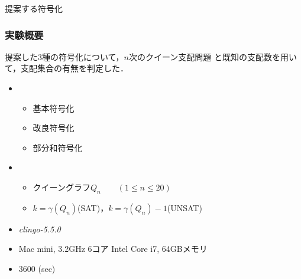 \documentclass[dvipdfmx,10pt]{beamer}
\begin{document}
\begin{frame}{提案する符号化}
\end{frame}

%
%
 
\begin{frame}\frametitle{実験概要}
 \begin{block}{}
  提案した3種の符号化について，$n$次のクイーン支配問題
  と既知の支配数を用いて，支配集合の有無を判定した．
 \end{block}
 \begin{itemize}
  \item {}
	\begin{itemize}
	 \item 基本符号化
	 \item 改良符号化
	 \item 部分和符号化
	\end{itemize}
  \item {}
	\begin{itemize}
	 \item クイーングラフ$Q_{n} \qquad (1 \leq n \leq 20)$
	 \item $k=\gamma(Q_{n})$\quad (SAT)，$k=\gamma(Q_{n})-1$\quad (UNSAT)
	\end{itemize}
  \item {} \textit{clingo-5.5.0}
  \item {} Mac mini, 3.2GHz 6コア Intel Core i7, 64GBメモリ
  \item {} 3600 (sec)
 \end{itemize}
\end{frame}
\end{document}
